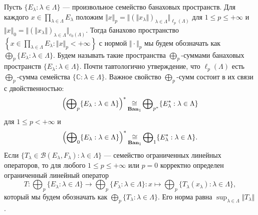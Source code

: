 Пусть $\{E_\lambda:\lambda\in\Lambda\}$ --- произвольное семейство банаховых пространств. Для каждого $x\in \prod_{\lambda\in\Lambda} E_\lambda$ положим
$\Vert x\Vert_p=\Vert(\Vert x_\lambda\Vert)_{\lambda\in\Lambda}\Vert_{\ell_p(\Lambda)}$ для $1\leq p\leq +\infty$ и $\Vert x\Vert_0=\Vert(\Vert x_\lambda\Vert)_{\lambda\in\Lambda}\Vert_{c_0(\Lambda)}$. Тогда банахово пространство $\left\{x\in \prod_{\lambda\in\Lambda} E_\lambda: \Vert x\Vert_p<+\infty\right\}$ с нормой $\Vert\cdot\Vert_p$ мы будем обозначать как $\bigoplus_p\{E_\lambda:\lambda\in\Lambda\}$. Будем называть такие пространства $\bigoplus_p$-суммами банаховых пространств $\{E_\lambda:\lambda\in\Lambda\}$. Почти тавтологично утверждение, что $\ell_p(\Lambda)$ есть $\bigoplus_p$-сумма семейства $\{\mathbb{C}:\lambda\in\Lambda\}$. Важное свойство $\bigoplus_p$-сумм состоит в их связи с двойственностью:
$$
\left(\bigoplus\nolimits_p\{E_\lambda:\lambda\in\Lambda\}\right)^*\mathop{\mathbin{\cong}}\limits_{\mathbf{Ban}_1}
\bigoplus\nolimits_{p^*}\{E_\lambda^*:\lambda\in\Lambda\}
$$
для $1\leq p<+\infty$ и 
$$
\left(\bigoplus\nolimits_0\{E_\lambda:\lambda\in\Lambda\}\right)^*\mathop{\mathbin{\cong}}\limits_{\mathbf{Ban}_1}
\bigoplus\nolimits_1\{E_\lambda^*:\lambda\in\Lambda\}.
$$
Если $\{T_\lambda\in\mathcal{B}(E_\lambda, F_\lambda):\lambda\in\Lambda\}$ --- семейство ограниченных линейных операторов, то для любого $1\leq p\leq+\infty$ или $p=0$ корректно определен ограниченный линейный оператор
$$
T:\bigoplus\nolimits_p\{E_\lambda:\lambda\in\Lambda\}\to \bigoplus\nolimits_p\{ F_\lambda:\lambda\in\Lambda\}:x\mapsto \bigoplus\nolimits_p\{ T_\lambda(x_\lambda):\lambda\in\Lambda\},
$$
который мы будем обозначать как $\bigoplus_p\{T_\lambda:\lambda\in\Lambda\}$. Его норма равна $\sup_{\lambda\in\Lambda}\Vert T_\lambda\Vert$.

